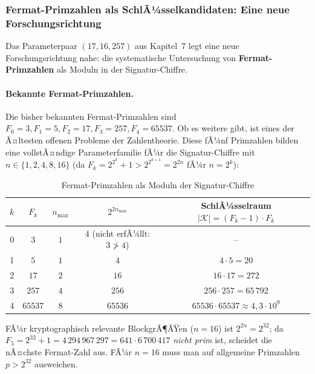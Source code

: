 ﻿\documentclass[a4paper,12pt]{scrreprt}
\theoremstyle{definition}
\begin{document}
\subsubsection{Fermat-Primzahlen als SchlÃ¼sselkandidaten: Eine neue Forschungsrichtung}

Das Parameterpaar $(17, 16, 257)$ aus Kapitel~7 legt eine neue Forschungsrichtung nahe: die systematische Untersuchung von \textbf{Fermat-Primzahlen} als Moduln in der Signatur-Chiffre.

\paragraph{Bekannte Fermat-Primzahlen.}
Die bisher bekannten Fermat-Primzahlen sind $F_0=3, F_1=5, F_2=17, F_3=257, F_4=65537$. Ob es weitere gibt, ist eines der Ã¤ltesten offenen Probleme der Zahlentheorie. Diese fÃ¼nf Primzahlen bilden eine vollstÃ¤ndige Parameterfamilie fÃ¼r die Signatur-Chiffre mit $n \in \{1, 2, 4, 8, 16\}$ (da $F_k = 2^{2^k}+1 > 2^{2^{k+1}} = 2^{2n}$ fÃ¼r $n = 2^k$):

\begin{table}[H]
\centering
\caption{Fermat-Primzahlen als Moduln der Signatur-Chiffre}
\label{tab:fermat}
\begin{tabular}{@{}ccccc@{}}
\toprule
$k$ & $F_k$ & $n_{\max}$ & $2^{2n_{\max}}$ & SchlÃ¼sselraum $|\mathcal{K}| = (F_k-1)\cdot F_k$ \\
\midrule
0 & $3$      & $1$ & $4$ (nicht erfÃ¼llt: $3 \not> 4$) & -- \\
1 & $5$      & $1$ & $4$ & $4 \cdot 5 = 20$ \\
2 & $17$     & $2$ & $16$ & $16 \cdot 17 = 272$ \\
3 & $257$    & $4$ & $256$ & $256 \cdot 257 = 65\,792$ \\
4 & $65537$  & $8$ & $65536$ & $65536 \cdot 65537 \approx 4{,}3 \cdot 10^9$ \\
\bottomrule
\end{tabular}
\end{table}

FÃ¼r kryptographisch relevante BlockgrÃ¶ÃŸen ($n = 16$) ist $2^{2n} = 2^{32}$; da $F_5 = 2^{32}+1 = 4\,294\,967\,297 = 641 \cdot 6\,700\,417$ \emph{nicht prim} ist, scheidet die nÃ¤chste Fermat-Zahl aus. FÃ¼r $n=16$ muss man auf allgemeine Primzahlen $p > 2^{32}$ ausweichen.
\end{document}
